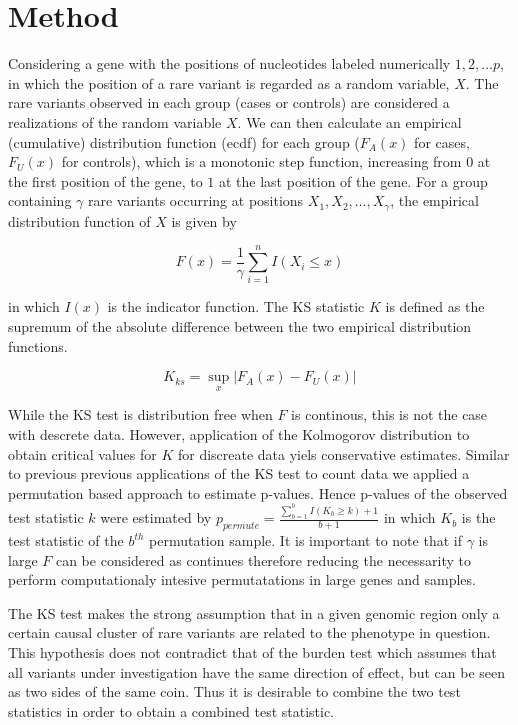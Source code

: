 \section{Method}
\label{sec:method}

Considering a gene with the positions of nucleotides labeled numerically $1, 2, \ldots p$, in which the position of a rare variant is regarded as a random variable, $X$.
The rare variants observed in each group (cases or controls) are considered a realizations of the random variable $X$.
We can then calculate an empirical (cumulative) distribution function (ecdf) for each group ($F_A(x)$ for cases, $F_U(x)$ for controls), which is a monotonic step function, increasing from $0$ at the first position of the gene, to $1$ at the last position of the gene.
For a group containing $\gamma$ rare variants occurring at positions $X_1, X_2, \ldots, X_\gamma$, the empirical distribution function of $X$ is given by

\begin{equation}
	F(x) = \frac{1}{\gamma}\sum^n_{i=1}I(X_i \leq x)
\end{equation}

in which $I(x)$ is the indicator function.
The KS statistic $K$ is defined as the supremum of the absolute difference between the two empirical distribution functions.

\begin{equation}
	K_{ks} = \sup_x | F_A(x) - F_U(x) |
\end{equation}

While the KS test is distribution free when $F$ is continous, this is not the case with descrete data.
However, application of the Kolmogorov distribution to obtain critical values for $K$ for discreate data yiels conservative estimates\cite{Walsh1963,Conover1972}. 
Similar to previous previous applications of the KS test to count data we applied a permutation based approach to estimate p-values. 
Hence p-values of the observed test statistic $k$ were estimated by $p_{permute} = \frac{\sum^b_{b=1} I(K_b \geq k)+1}{b+1}$ in which $K_b$ is the test statistic of the $b^{th}$ permutation sample.
It is important to note that if $\gamma$ is large $F$ can be considered as continues therefore reducing the necessarity to perform computationaly intesive permutatations in large genes and samples. 

The KS test makes the strong assumption that in a given genomic region only a certain causal cluster of rare variants are related to the phenotype in question.
This hypothesis does not contradict that of the burden test which assumes that all variants under investigation have the same direction of effect, but can be seen as two sides of the same coin.
Thus it is desirable to combine the two test statistics in order to obtain a combined test statistic.

